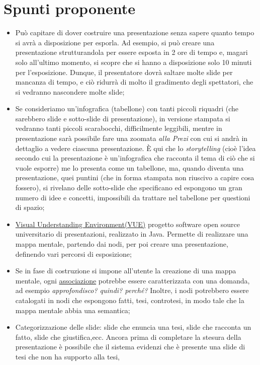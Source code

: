\section{Spunti proponente}
\begin{itemize}
\item Può capitare di dover costruire una presentazione senza sapere quanto tempo si avrà 
a disposizione per esporla. 
Ad esempio, si può creare una presentazione strutturandola per essere esposta in 2 ore di tempo e, magari solo all'ultimo momento, 
si scopre che si hanno a disposizione solo 10 minuti per l'esposizione.
Dunque, il presentatore dovrà saltare molte slide per mancanza di tempo, e ciò ridurrà di molto il gradimento degli spettatori, che si vedranno nascondere molte slide;
\item Se consideriamo un'infografica (tabellone) con tanti piccoli riquadri (che sarebbero slide e sotto-slide di presentazione),
in versione stampata si vedranno tanti piccoli scarabocchi, difficilmente leggibili, 
mentre in presentazione sarà possibile fare una zoomata \textit{alla Prezi} con cui si andrà in dettaglio a vedere ciascuna presentazione.
\`E qui che lo \textit{storytelling} (cioè l'idea secondo cui la presentazione è un'infografica che racconta il tema di ciò che 
si vuole esporre) me lo presenta come un tabellone, ma, quando diventa una presentazione, quei puntini (che in forma stampata non riuscivo a capire cosa fossero), si rivelano delle sotto-slide che specificano ed espongono un gran numero di idee e concetti, impossibili da trattare nel tabellone per questioni di spazio;
\item \underline{Visual Understanding Environment(VUE)} progetto software open source universitario di presentazioni, realizzato in Java. 
Permette di realizzare una mappa mentale, partendo dai nodi, per poi creare una presentazione, definendo vari percorsi di esposizione;
\item Se in fase di costruzione si impone all'utente la creazione di una mappa mentale, 
ogni \underline{associazione} potrebbe essere caratterizzata con una domanda, ad esempio \textit{approfondisco? quindi? perché?}
Inoltre, i nodi potrebbero essere catalogati in nodi che espongono fatti, tesi, controtesi, in modo tale che la mappa mentale abbia una semantica;
\item Categorizzazione delle slide: slide che enuncia una tesi, slide che racconta un fatto, slide che giustifica,ecc.
Ancora prima di completare la stesura della presentazione è possibile che il sistema evidenzi che è presente una slide di tesi che non ha supporto alla tesi, 

\end{itemize}
